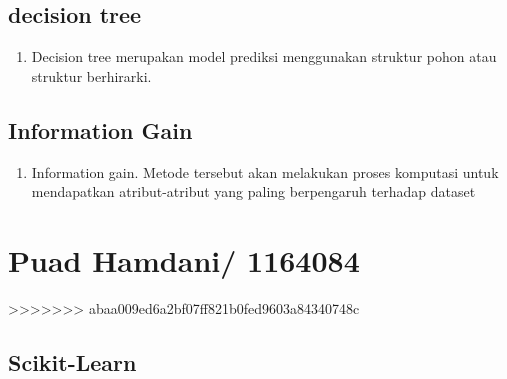 \subsection{decision tree}
\begin{enumerate}
\item Decision tree merupakan model prediksi menggunakan struktur pohon atau struktur berhirarki.
\end{enumerate}

\subsection{Information Gain}
\begin{enumerate}
\item Information gain. Metode tersebut akan melakukan proses komputasi untuk mendapatkan atribut-atribut yang paling berpengaruh terhadap dataset
\end{enumerate}


\section{Puad Hamdani/ 1164084}
>>>>>>> abaa009ed6a2bf07ff821b0fed9603a84340748c
\subsection{Scikit-Learn}

